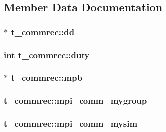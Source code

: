 \subsection{\-Member \-Data \-Documentation}
\hypertarget{structt__commrec_a0f63c52fa221b3911a3ddeca6e403c7b}{
\subsubsection[{dd}]{ $\ast$ {\bf t\-\_\-commrec\-::dd}}}\label{structt__commrec_a0f63c52fa221b3911a3ddeca6e403c7b}
\hypertarget{structt__commrec_a0b6d84d1dbb49e7b8d3c130dd1e14aed}{
\subsubsection[{duty}]{\setlength{\rightskip}{0pt plus 5cm}int {\bf t\-\_\-commrec\-::duty}}}\label{structt__commrec_a0b6d84d1dbb49e7b8d3c130dd1e14aed}
\hypertarget{structt__commrec_a482d497cbce5f9560a13fa46ed393127}{
\subsubsection[{mpb}]{ $\ast$ {\bf t\-\_\-commrec\-::mpb}}}\label{structt__commrec_a482d497cbce5f9560a13fa46ed393127}
\hypertarget{structt__commrec_a646b92f6a02150acd219ef44f20fff41}{
\subsubsection[{mpi\-\_\-comm\-\_\-mygroup}]{ {\bf t\-\_\-commrec\-::mpi\-\_\-comm\-\_\-mygroup}}}\label{structt__commrec_a646b92f6a02150acd219ef44f20fff41}
\hypertarget{structt__commrec_a1fcec597442c2ef491b3727aaac4074b}{
\subsubsection[{mpi\-\_\-comm\-\_\-mysim}]{ {\bf t\-\_\-commrec\-::mpi\-\_\-comm\-\_\-mysim}}}\label{structt__commrec_a1fcec597442c2ef491b3727aaac4074b}
